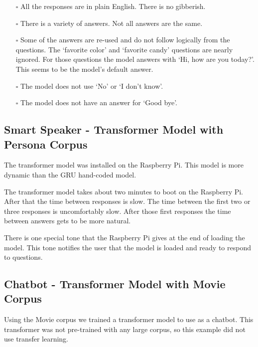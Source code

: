 \begin{itemize}
	
	\item[\rlap{\raisebox{0.3ex}{\hspace{0.4ex}\scriptsize \ding{52}}}$\square$] All the responses are in plain English. There is no gibberish.
	
	\item[\rlap{\raisebox{0.3ex}{\hspace{0.4ex}\scriptsize \ding{52}}}$\square$] There is a variety of answers. Not all answers are the same.
	
	\item[\rlap{\raisebox{0.3ex}{\hspace{0.4ex}\scriptsize \ding{56}}}$\square$] Some of the answers are re-used and do not follow logically from the questions. The `favorite color' and `favorite candy' questions are nearly ignored. For those questions the model answers with `Hi, how are you today?'. This seems to be the model's default answer.
	
	\item[\rlap{\raisebox{0.3ex}{\hspace{0.4ex}\scriptsize \ding{52}}}$\square$] The model does not use `No' or `I don't know'.
	
	\item[\rlap{\raisebox{0.3ex}{\hspace{0.4ex}\scriptsize \ding{56}}}$\square$] The model does not have an answer for `Good bye'.
\end{itemize}


\subsection{Smart Speaker - Transformer Model with Persona Corpus}

The transformer model was installed on the Raspberry Pi. This model is more dynamic than the GRU hand-coded model. 

The transformer model takes about two minutes to boot on the Raspberry Pi. After that the time between responses is slow. The time between the first two or three responses is uncomfortably slow. After those first responses the time between answers gets to be more natural.

There is one special tone that the Raspberry Pi gives at the end of loading the model. This tone notifies the user that the model is loaded and ready to respond to questions.


\subsection{Chatbot - Transformer Model with Movie Corpus}
Using the Movie corpus we trained a transformer model to use as a chatbot. This transformer was not pre-trained with any large corpus, so this example did not use transfer learning. 

